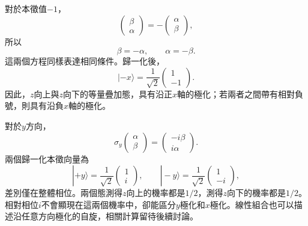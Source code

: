 \begin{classroomqa}
\end{classroomqa}

對於本徵值\(-1\)，
\begin{equation}
\begin{pmatrix}
\beta\\
\alpha
\end{pmatrix}
=
-
\begin{pmatrix}
\alpha\\
\beta
\end{pmatrix},
\end{equation}
所以
\begin{equation}
\beta=-\alpha,
\qquad
\alpha=-\beta.
\end{equation}
這兩個方程同樣表達相同條件。歸一化後，
\begin{equation}
|-x\rangle
=
\frac{1}{\sqrt2}
\begin{pmatrix}
1\\
-1
\end{pmatrix}.
\end{equation}
因此，\(z\)向上與\(z\)向下的等量疊加態，具有沿正\(x\)軸的極化；若兩者之間帶有相對負號，則具有沿負\(x\)軸的極化。

對於\(y\)方向，
\begin{equation}
\sigma_y
\begin{pmatrix}
\alpha\\
\beta
\end{pmatrix}
=
\begin{pmatrix}
-i\beta\\
i\alpha
\end{pmatrix}.
\end{equation}
兩個歸一化本徵向量為
\begin{equation}
|+y\rangle
=
\frac{1}{\sqrt2}
\begin{pmatrix}
1\\
i
\end{pmatrix},
\qquad
|-y\rangle
=
\frac{1}{\sqrt2}
\begin{pmatrix}
1\\
-i
\end{pmatrix},
\end{equation}
差別僅在整體相位。兩個態測得\(z\)向上的機率都是\(1/2\)，測得\(z\)向下的機率都是\(1/2\)。相對相位\(i\)不會顯現在這兩個機率中，卻能區分\(y\)極化和\(x\)極化。線性組合也可以描述沿任意方向極化的自旋，相關計算留待後續討論。

